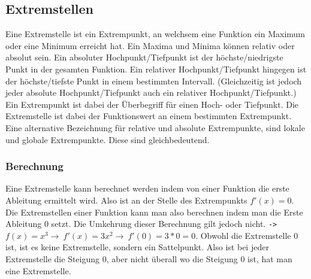 \documentclass{article}
\begin{document}
	\subsection{Extremstellen}
	Eine Extremstelle ist ein Extrempunkt, an welchsem eine Funktion ein Maximum oder eine Minimum erreicht hat. Ein Maxima und Minima können relativ oder absolut sein. Ein absoluter Hochpunkt/Tiefpunkt ist der höchste/niedrigste Punkt in der gesamten Funktion. Ein relativer Hochpunkt/Tiefpunkt hingegen ist der höchste/tiefste Punkt in einem bestimmten Intervall. (Gleichzeitig ist jedoch jeder absolute Hochpunkt/Tiefpunkt auch ein relativer Hochpunkt/Tiefpunkt.) Ein Extrempunkt ist dabei der Überbegriff für einen Hoch- oder Tiefpunkt. Die Extremstelle ist dabei der Funktionswert an einem bestimmten Extrempunkt. Eine alternative Bezeichnung für relative und absolute Extrempunkte, sind lokale und globale Extrempunkte. Diese sind gleichbedeutend. \\
	\subsubsection{Berechnung}
	Eine Extremstelle kann berechnet werden indem von einer Funktion die erste Ableitung ermittelt wird. Also ist an der Stelle des Extrempunkts $f'(x)=0$. Die Extremstellen einer Funktion kann man also berechnen indem man die Erste Ableitung 0 setzt. Die Umkehrung dieser Berechnung gilt jedoch nicht. \verb|->| $f(x)=x^3\to\ f'(x)=3x^2\to\ f'(0)=3*0=0$. Obwohl die Extremstelle 0 ist, ist es keine Extremstelle, sondern ein Sattelpunkt. Also ist bei jeder Extremstelle die Steigung 0, aber nicht überall wo die Steigung 0 ist, hat man eine Extremstelle.
\end{document}
